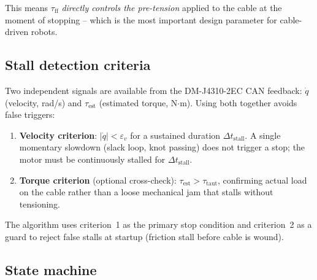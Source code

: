 \documentclass[11pt,a4paper]{article}
\begin{document}
This means $\tau_\text{ff}$ \emph{directly controls the pre-tension}
applied to the cable at the moment of stopping -- which is the most important
design parameter for cable-driven robots.

\subsection{Stall detection criteria}

Two independent signals are available from the DM-J4310-2EC CAN feedback:
$\dot q$ (velocity, rad/s) and $\tau_\text{est}$ (estimated torque, N$\cdot$m).
Using both together avoids false triggers:

\begin{enumerate}
  \item \textbf{Velocity criterion}: $|\dot q| < \varepsilon_v$ for a sustained
        duration $\Delta t_\text{stall}$.  A single momentary slowdown (slack
        loop, knot passing) does not trigger a stop; the motor must be
        continuously stalled for $\Delta t_\text{stall}$.
  \item \textbf{Torque criterion} (optional cross-check):
        $\tau_\text{est} > \tau_\text{taut}$, confirming actual load on the cable
        rather than a loose mechanical jam that stalls without tensioning.
\end{enumerate}

The algorithm uses criterion~1 as the primary stop condition and
criterion~2 as a guard to reject false stalls at startup (friction stall
before cable is wound).

\subsection{State machine}
\label{sec:statemachine}
\end{document}
